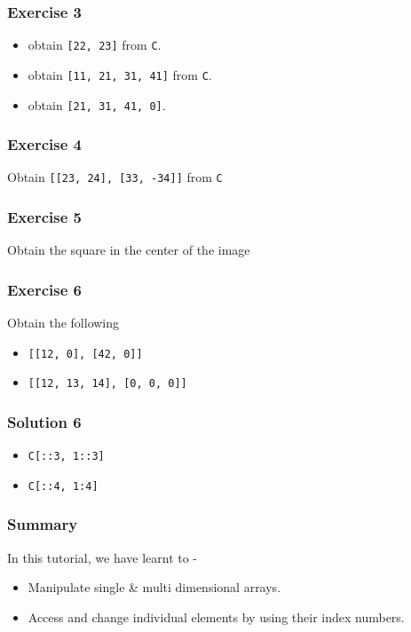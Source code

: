 \documentclass[17pt,compress]{beamer}
\begin{document}
\begin{frame}
\frametitle{Exercise 3}
\label{sec-8}

\begin{itemize}
\item obtain \texttt{[22, 23]} from \texttt{C}.
\item obtain \texttt{[11, 21, 31, 41]} from \texttt{C}.
\item obtain \texttt{[21, 31, 41, 0]}.
\end{itemize}
\end{frame}
\begin{frame}
\frametitle{Exercise 4}
\label{sec-9}

  Obtain \texttt{[[23, 24], [33, -34]]} from \texttt{C}
\end{frame}
\begin{frame}
\frametitle{Exercise 5}
\label{sec-10}

  Obtain the square in the center of the image
\end{frame}
\begin{frame}[fragile]
\frametitle{Exercise 6}
\label{sec-11}

  Obtain the following
\begin{itemize}
\item \texttt{[[12, 0], [42, 0]]}\pause
\item \texttt{[[12, 13, 14], [0, 0, 0]]}
\end{itemize}
\end{frame}
\begin{frame}[fragile]
\frametitle{Solution 6}
\label{sec-12}

\begin{itemize}
\item \texttt{C[::3, 1::3]}\pause
\item \texttt{C[::4, 1:4]}
\end{itemize}

\end{frame}
\begin{frame}
\frametitle{Summary}
\label{sec-13.1}

  In this tutorial, we have learnt to -

\begin{itemize}
\item Manipulate single \& multi dimensional arrays.
\item Access and change individual elements by using their index numbers.
\end{itemize}
\end{frame}
\end{document}
